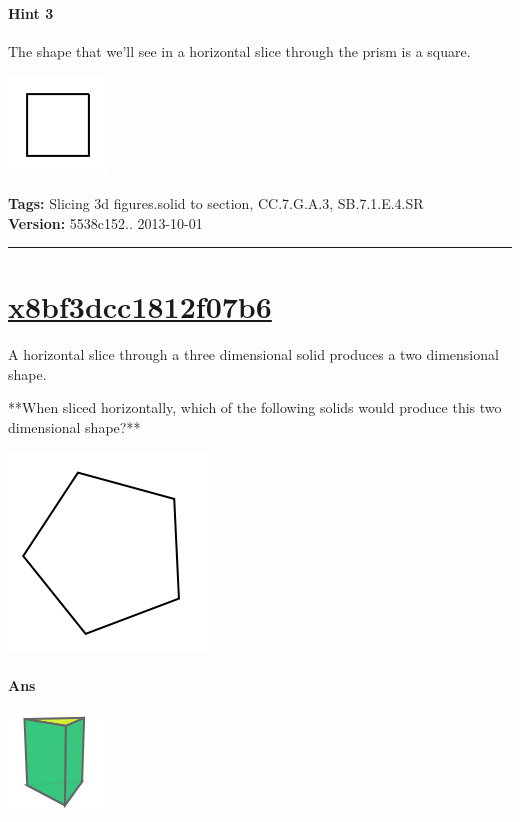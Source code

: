\documentclass[twocolumn,10pt]{article}
\def\shrinkfactor{0.55}
\begin{document}
\paragraph{Hint 3}The shape that we'll see in a horizontal slice through the prism is a square.  

\includegraphics[scale=\shrinkfactor]{figures/4b59a0ece6acc7c19c389e1de534d1df93bf1169.png}



\medskip
\noindent
\textbf{Tags:} {\footnotesize Slicing 3d figures.solid to section, CC.7.G.A.3, SB.7.1.E.4.SR}\\
\textbf{Version:} 5538c152.. 2013-10-01
\smallskip\hrule





\section{\href{https://www.khanacademy.org/devadmin/content/items/x8bf3dcc1812f07b6}{x8bf3dcc1812f07b6}}

\noindent
A horizontal slice through a three dimensional solid produces a two dimensional shape.

**When sliced horizontally, which of the following solids would produce this two dimensional shape?**   

\includegraphics[scale=\shrinkfactor]{figures/f6f3d7d862af181c9db9337ad959b4868e25835c.png} 


\paragraph{Ans} 


\includegraphics[scale=\shrinkfactor]{figures/df7e52cb3a541015199076ff457ee6bdda3a663c.png}
\end{document}
